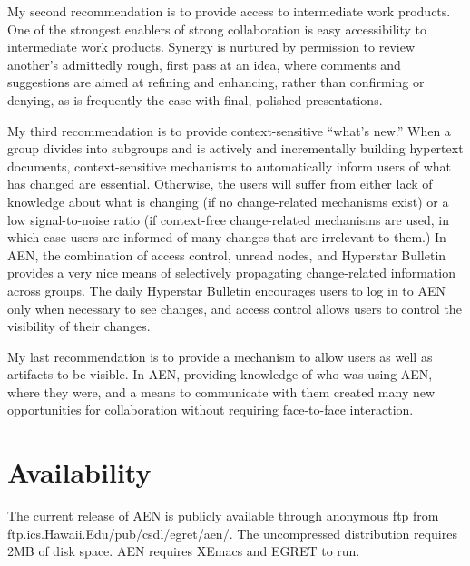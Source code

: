 My second recommendation is to provide access to intermediate work
products.  One of the strongest enablers of strong collaboration is easy
accessibility to intermediate work products.  Synergy is nurtured by
permission to review another's admittedly rough, first pass at an idea,
where comments and suggestions are aimed at refining and enhancing, rather
than confirming or denying, as is frequently the case with final, polished
presentations.

My third recommendation is to provide context-sensitive ``what's new.''
When a group divides into subgroups and is actively and incrementally
building hypertext documents, context-sensitive mechanisms to automatically
inform users of what has changed are essential. Otherwise, the users will
suffer from either lack of knowledge about what is changing (if no
change-related mechanisms exist) or a low signal-to-noise ratio (if
context-free change-related mechanisms are used, in which case users are
informed of many changes that are irrelevant to them.)  In AEN, the
combination of access control, unread nodes, and Hyperstar Bulletin
provides a very nice means of selectively propagating change-related
information across groups.  The daily Hyperstar Bulletin encourages users
to log in to AEN only when necessary to see changes, and access control
allows users to control the visibility of their changes.

My last recommendation is to provide a mechanism to allow users as well as
artifacts to be visible.  In AEN, providing knowledge of who was using AEN,
where they were, and a means to communicate with them created many new
opportunities for collaboration without requiring face-to-face interaction.



\section{Availability}

The current release of AEN is publicly available through anonymous ftp from 
ftp.ics.Hawaii.Edu/pub/csdl/egret/aen/.  The uncompressed distribution
requires 2MB of disk space.  AEN requires XEmacs and EGRET to run.







